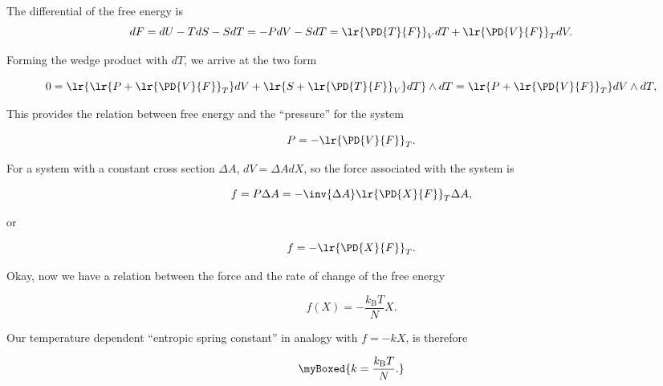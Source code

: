 {The differential of the free energy is 
\begin{dmath}\label{eqn:basicStatMechProblemSet5Problem1:180}
dF 
= dU - T dS - S dT
= -P dV - S dT
= 
\lr{\PD{T}{F}}_V dT
+
\lr{\PD{V}{F}}_T dV.
\end{dmath}

Forming the wedge product with $dT$, we arrive at the two form

\begin{dmath}\label{eqn:basicStatMechProblemSet5Problem1:200}
0 = 
\lr{
\lr{ P + 
\lr{\PD{V}{F}}_T 
} dV
+ \lr{ S +
\lr{\PD{T}{F}}_V 
} dT } \wedge dT
=
\lr{ P + 
\lr{\PD{V}{F}}_T 
} dV \wedge dT,
\end{dmath}

This provides the relation between free energy and the ``pressure'' for the system

\begin{equation}\label{eqn:basicStatMechProblemSet5Problem1:220}
P = - \lr{\PD{V}{F}}_T.
\end{equation}

For a system with a constant cross section $\Delta A$, $dV = \Delta A dX$, so the force associated with the system is

\begin{equation}\label{eqn:basicStatMechProblemSet5Problem1:240}
f = P \Delta A 
= - \inv{\Delta A} \lr{\PD{X}{F}}_T \Delta A,
\end{equation}

or

\begin{equation}\label{eqn:basicStatMechProblemSet5Problem1:300}
f = - \lr{\PD{X}{F}}_T.
\end{equation}

Okay, now we have a relation between the force and the rate of change of the free energy

\begin{equation}\label{eqn:basicStatMechProblemSet5Problem1:320}
f(X) = -\frac{k_{\mathrm{B}} T}{N} X.
\end{equation}

Our temperature dependent ``entropic spring constant'' in analogy with $f = -k X$, is therefore

\begin{equation}\label{eqn:basicStatMechProblemSet5Problem1:340}
\myBoxed{
k = \frac{k_{\mathrm{B}} T}{N}.
}
\end{equation}
}
